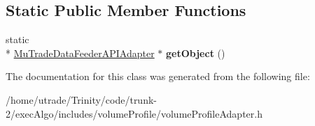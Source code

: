 \subsection*{Static Public Member Functions}
\begin{DoxyCompactItemize}
\item 
\hypertarget{classmutrade_1_1_data_a_p_i_1_1_mu_trade_data_feeder_a_p_i_adapter_a0c03f8929f6e7ef433681048a092c67a}{static \\*
\hyperlink{classmutrade_1_1_data_a_p_i_1_1_mu_trade_data_feeder_a_p_i_adapter}{Mu\-Trade\-Data\-Feeder\-A\-P\-I\-Adapter} $\ast$ {\bfseries get\-Object} ()}\label{classmutrade_1_1_data_a_p_i_1_1_mu_trade_data_feeder_a_p_i_adapter_a0c03f8929f6e7ef433681048a092c67a}

\end{DoxyCompactItemize}


The documentation for this class was generated from the following file\-:\begin{DoxyCompactItemize}
\item 
/home/utrade/\-Trinity/code/trunk-\/2/exec\-Algo/includes/volume\-Profile/volume\-Profile\-Adapter.\-h\end{DoxyCompactItemize}
